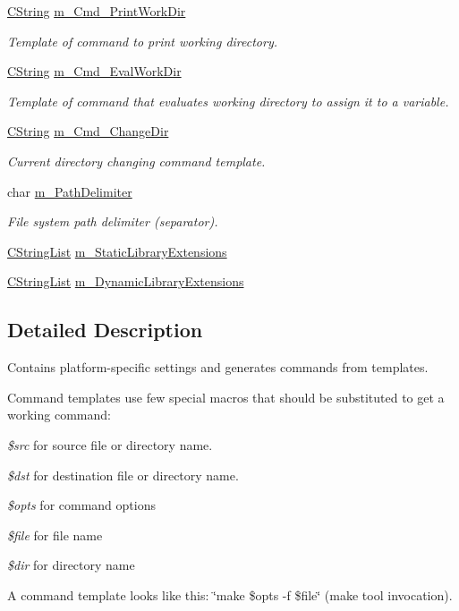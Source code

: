 \begin{DoxyCompactItemize}
\hyperlink{classCString}{C\-String} \hyperlink{classCPlatform_ac73a69c8dd13152763b4020d37270f2e}{m\-\_\-\-Cmd\-\_\-\-Print\-Work\-Dir}
\begin{DoxyCompactList}\small\item\em Template of command to print working directory. \end{DoxyCompactList}\item 
\hyperlink{classCString}{C\-String} \hyperlink{classCPlatform_a3e29909e2f0126abea8612a574e94f87}{m\-\_\-\-Cmd\-\_\-\-Eval\-Work\-Dir}
\begin{DoxyCompactList}\small\item\em Template of command that evaluates working directory to assign it to a variable. \end{DoxyCompactList}\item 
\hyperlink{classCString}{C\-String} \hyperlink{classCPlatform_afcc41e3bc120c775f353df881ddde397}{m\-\_\-\-Cmd\-\_\-\-Change\-Dir}
\begin{DoxyCompactList}\small\item\em Current directory changing command template. \end{DoxyCompactList}\item 
char \hyperlink{classCPlatform_a9f8da12c0ef92a1660218fe7e33beced}{m\-\_\-\-Path\-Delimiter}
\begin{DoxyCompactList}\small\item\em File system path delimiter (separator). \end{DoxyCompactList}\item 
\hyperlink{classCStringList}{C\-String\-List} \hyperlink{classCPlatform_a7ad50b7535d0a1518ef26619d4804700}{m\-\_\-\-Static\-Library\-Extensions}
\item 
\hyperlink{classCStringList}{C\-String\-List} \hyperlink{classCPlatform_a5a8d28621cc908b51fa19284899e4374}{m\-\_\-\-Dynamic\-Library\-Extensions}
\end{DoxyCompactItemize}


\subsection{Detailed Description}
Contains platform-\/specific settings and generates commands from templates. 

Command templates use few special macros that should be substituted to get a working command\-:

\begin{DoxyItemize}
\item {\itshape \$src} for source file or directory name. \item {\itshape \$dst} for destination file or directory name. \item {\itshape \$opts} for command options \item {\itshape \$file} for file name \item {\itshape \$dir} for directory name\end{DoxyItemize}
A command template looks like this\-: {\ttfamily \char`\"{}make \$opts -\/f \$file\char`\"{}} (make tool invocation). 

